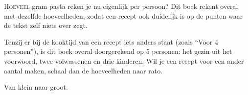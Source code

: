 
\lettrine{H}{oeveel} gram pasta reken je nu eigenlijk per persoon? Dit
boek rekent overal met dezelfde hoeveelheden, zodat een recept ook
duidelijk is op de punten waar de tekst zelf niets over zegt.

Tenzij er bij de kooktijd van een recept iets anders staat (zoals ``Voor 4
personen''), is dit boek overal doorgerekend op 5 personen: het gezin uit
het voorwoord, twee volwassenen en drie kinderen. Wil je een recept voor
een ander aantal maken, schaal dan de hoeveelheden naar rato.

Van klein naar groot.

